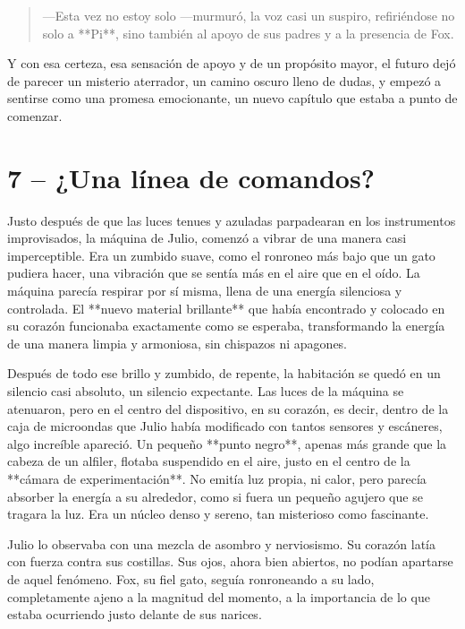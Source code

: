 \documentclass[a4paper,12pt]{book}
\begin{document}
\begin{quote}
    —Esta vez no estoy solo —murmuró, la voz casi un suspiro, refiriéndose no solo a **Pi**, sino también al apoyo de sus padres y a la presencia de Fox.
\end{quote}

Y con esa certeza, esa sensación de apoyo y de un propósito mayor, el futuro dejó de parecer un misterio aterrador, un camino oscuro lleno de dudas, y empezó a sentirse como una promesa emocionante, un nuevo capítulo que estaba a punto de comenzar.

\cleardoublepage %

\chapter*{7 – ¿Una línea de comandos?}

Justo después de que las luces tenues y azuladas parpadearan en los instrumentos improvisados, la máquina de Julio, comenzó a vibrar de una manera casi imperceptible. Era un zumbido suave, como el ronroneo más bajo que un gato pudiera hacer, una vibración que se sentía más en el aire que en el oído. La máquina parecía respirar por sí misma, llena de una energía silenciosa y controlada. El **nuevo material brillante** que había encontrado y colocado en su corazón funcionaba exactamente como se esperaba, transformando la energía de una manera limpia y armoniosa, sin chispazos ni apagones.

Después de todo ese brillo y zumbido, de repente, la habitación se quedó en un silencio casi absoluto, un silencio expectante. Las luces de la máquina se atenuaron, pero en el centro del dispositivo, en su corazón, es decir, dentro de la caja de microondas que Julio había modificado con tantos sensores y escáneres, algo increíble apareció. Un pequeño **punto negro**, apenas más grande que la cabeza de un alfiler, flotaba suspendido en el aire, justo en el centro de la **cámara de experimentación**. No emitía luz propia, ni calor, pero parecía absorber la energía a su alrededor, como si fuera un pequeño agujero que se tragara la luz. Era un núcleo denso y sereno, tan misterioso como fascinante.

Julio lo observaba con una mezcla de asombro y nerviosismo. Su corazón latía con fuerza contra sus costillas. Sus ojos, ahora bien abiertos, no podían apartarse de aquel fenómeno. Fox, su fiel gato, seguía ronroneando a su lado, completamente ajeno a la magnitud del momento, a la importancia de lo que estaba ocurriendo justo delante de sus narices.
\end{document}

